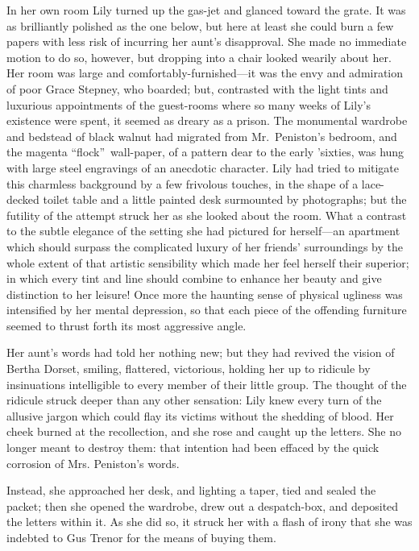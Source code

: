 \documentclass[12pt,a4paper]{book}
\begin{document}
In her own room Lily turned up the gas-jet and glanced toward the
grate. It was as brilliantly polished as the one below, but here
at least she could burn a few papers with less risk of incurring
her aunt's disapproval. She made no immediate motion to do so,
however, but dropping into a chair looked wearily about her. Her
room was large and comfortably-furnished---it was the envy and
admiration of poor Grace Stepney, who boarded; but, contrasted
with the light tints and luxurious appointments of the
guest-rooms where so many weeks of Lily's existence were spent,
it seemed as dreary as a prison. The monumental wardrobe and
bedstead of black walnut had migrated from Mr.\ Peniston's
bedroom, and the magenta ``flock''\ wall-paper, of a pattern dear to
the early 'sixties, was hung with large steel engravings
of an anecdotic character. Lily had tried to mitigate this
charmless background by a few frivolous touches, in the shape of
a lace-decked toilet table and a little painted desk surmounted
by photographs; but the futility of the attempt struck her as she
looked about the room. What a contrast to the subtle elegance of
the setting she had pictured for herself---an apartment which
should surpass the complicated luxury of her friends'
surroundings by the whole extent of that artistic sensibility
which made her feel herself their superior; in which every tint
and line should combine to enhance her beauty and give
distinction to her leisure! Once more the haunting sense of
physical ugliness was intensified by her mental depression, so
that each piece of the offending furniture seemed to thrust forth
its most aggressive angle.





Her aunt's words had told her nothing new; but they had revived
the vision of Bertha Dorset, smiling, flattered, victorious,
holding her up to ridicule by insinuations intelligible to every
member of their little group. The thought of the ridicule struck
deeper than any other sensation: Lily knew every turn of the
allusive jargon which could flay its victims without the shedding
of blood. Her cheek burned at the recollection, and she rose and
caught up the letters. She no longer meant to destroy them: that
intention had been effaced by the quick corrosion of Mrs.
Peniston's words.





Instead, she approached her desk, and lighting a taper, tied and
sealed the packet; then she opened the wardrobe, drew out a
despatch-box, and deposited the letters within it. As she did so,
it struck her with a flash of irony that she was indebted to Gus
Trenor for the means of buying them.
\end{document}
